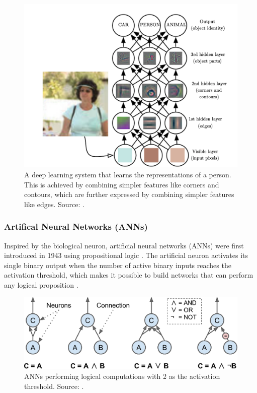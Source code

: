 \documentclass[a4paper, 11pt, oneside]{article}
\begin{document}
\begin{figure}[ht]
  \begin{center}
    \includegraphics[width=.8\textwidth]{deep_learning.png}
  \end{center}
  \caption{A deep learning system that learns the representations of a person. This is achieved by combining simpler
  features like corners and contours, which are further expressed by combining simpler features like edges. Source:
  \cite{goodfellow2016deep}.}
\end{figure}

\subsubsection{Artifical Neural Networks (ANNs)}

Inspired by the biological neuron, artificial neural networks (ANNs) were first introduced in 1943 using propositional
logic \cite{mcculloch1943logical}. The artificial neuron activates its single binary output when the number of active
binary inputs reaches the activation threshold, which makes it possible to build networks that can perform any logical
proposition \cite{geron2019hands, mcculloch1943logical}.

\begin{figure}[ht]
  \begin{center}
    \includegraphics[width=.5\textwidth]{ann_logic_computations.png}
  \end{center}
  \caption{ANNs performing logical computations with 2 as the activation threshold. Source: \cite{geron2019hands}.}
\end{figure}
\end{document}
